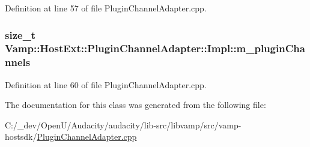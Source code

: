 Definition at line 57 of file Plugin\+Channel\+Adapter.\+cpp.

\subsubsection[{\texorpdfstring{m\+\_\+plugin\+Channels}{m_pluginChannels}}]{\setlength{\rightskip}{0pt plus 5cm}size\+\_\+t Vamp\+::\+Host\+Ext\+::\+Plugin\+Channel\+Adapter\+::\+Impl\+::m\+\_\+plugin\+Channels\hspace{0.3cm}{\ttfamily [protected]}}\hypertarget{class_vamp_1_1_host_ext_1_1_plugin_channel_adapter_1_1_impl_a94268d42f93bd26608fab34d5b4ad680}{}\label{class_vamp_1_1_host_ext_1_1_plugin_channel_adapter_1_1_impl_a94268d42f93bd26608fab34d5b4ad680}


Definition at line 60 of file Plugin\+Channel\+Adapter.\+cpp.



The documentation for this class was generated from the following file\+:\begin{DoxyCompactItemize}
\item 
C\+:/\+\_\+dev/\+Open\+U/\+Audacity/audacity/lib-\/src/libvamp/src/vamp-\/hostsdk/\hyperlink{_plugin_channel_adapter_8cpp}{Plugin\+Channel\+Adapter.\+cpp}\end{DoxyCompactItemize}
